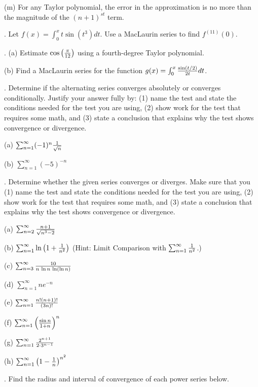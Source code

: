 \documentclass[12pt]{article}
\begin{document}
\noindent (m) For any Taylor polynomial, the error in the approximation is 
no more than the magnitude of the $(n+1)^{st}$ term.

\medskip
{}.  Let  $f(x) = \int_0^x t \sin(t^3) dt$.  Use a MacLaurin 
series to find $f^{(11)}(0)$.

.  (a) Estimate $\cos \left ( {{\pi}\over{12}} \right )$ using 
a fourth-degree Taylor polynomial.

\smallskip
\noindent (b) Find a MacLaurin series for the function $g(x)=\int_0^x 
{{\sin(t/2)}\over{2t}} dt$.

\medskip
{}.  Determine if the alternating series converges absolutely or 
converges conditionally.  Justify your answer fully by: (1) name the test 
and
state the conditions needed for the test you are using, (2) show work for
the test that requires some math, and (3) state a conclusion that
explains why the test shows convergence or divergence.

\noindent (a) $\sum_{n=1}^{\infty} (-1)^n {{1}\over{\sqrt{n}}}$

\medskip
\noindent (b) $\sum_{n=1}^{\infty} (-5)^{-n}$

\medskip
{}. Determine whether the given series converges or diverges. 
Make sure that you (1) name the test and state the conditions needed for 
the test you are using,
(2) show work for the test that requires some math, and (3) state a 
conclusion 
that explains why the test shows convergence or divergence.

\noindent (a) $\sum_{n=2}^\infty {{n+1}\over{\sqrt{n^3-2}}}$

\medskip
\noindent (b) $\sum_{n=1}^\infty \ln\left(1+{{1}\over{n^2}}\right)$
(Hint: Limit Comparison with $\sum_{n=1}^\infty {{1}\over{n^2}}$.)

\medskip
\noindent (c) $\sum_{n=3}^{\infty} {{10}\over {n\, \ln n\, \ln(\ln n)}}$

\medskip
\noindent (d) $\sum_{n=1}^{\infty} ne^{-n}$

\medskip
\noindent (e) $\sum_{n=1}^{\infty} {{n!(n+1)!}\over{(3n)!}}$

\medskip
\noindent (f) $\sum_{n=1}^{\infty}\left( {{\sin n}\over{1+n}}\right)^n$

\medskip
\noindent (g) $\sum_{n=1}^{\infty} {{2^{n+1}}\over{2\cdot 3^{n-1}}}$

\medskip
\noindent (h) $\sum_{n=1}^{\infty} \left( 1-{{1}\over{n}}\right)^{n^{2}}$

\medskip
{}.  Find the radius and interval of convergence of each power 
series below.
\end{document}
